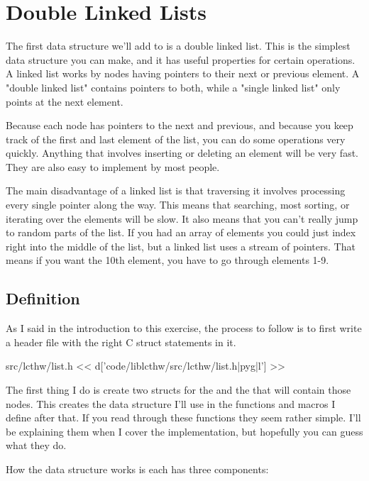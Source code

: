 \section{Double Linked Lists}

The first data structure we'll add to  is a double linked list.
This is the simplest data structure you can make, and it has useful properties
for certain operations.  A linked list works by nodes having pointers to their
next or previous element.  A "double linked list" contains pointers to both,
while a "single linked list" only points at the next element.

Because each node has pointers to the next and previous, and because you
keep track of the first and last element of the list, you can do some operations
very quickly.  Anything that involves inserting or deleting an element 
will be very fast.  They are also easy to implement by most people.

The main disadvantage of a linked list is that traversing it involves
processing every single pointer along the way.  This means that searching,
most sorting, or iterating over the elements will be slow.  It also means
that you can't really jump to random parts of the list.  If you had an 
array of elements you could just index right into the middle of the list,
but a linked list uses a stream of pointers.  That means if you want
the 10th element, you have to go through elements 1-9.

\subsection{Definition}

As I said in the introduction to this exercise, the process to follow is
to first write a header file with the right C struct statements in it.

\begin{code}{src/lcthw/list.h}
<< d['code/liblcthw/src/lcthw/list.h|pyg|l'] >>
\end{code}

The first thing I do is create two structs for the  and
the  that will contain those nodes.  This creates the data
structure I'll use in the functions and macros I define after that.  If
you read through these functions they seem rather simple.  I'll be 
explaining them when I cover the implementation, but hopefully you can
guess what they do.

How the data structure works is each  has three components:

